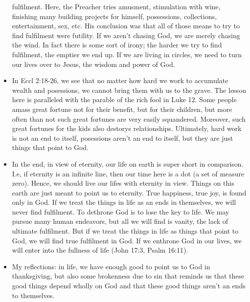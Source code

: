 \begin{itemize}
{  fulfilment.  Here, the Preacher tries amusment, stimulation with wine,
  finishing many building projects for himself, possessions, collections,
  entertainment, sex, etc.  His conclusion was that all of those means to try
  to find fulfilment were futility.  If we aren't chasing God, we are merely
  chasing the wind.  In fact there is some sort of irony; the harder we try
  to find fulfilment, the emptier we end up.  If we are living in circles, we
  need to turn our lives over to Jesus, the wisdom and power of God.}
  \item{In Eccl 2:18-26, we see that no matter how hard we work to accumulate
  wealth and posessions, we cannot bring them with us to the grave.  The
  lesson here is paralleled with the parable of the rich fool in Luke 12.
  Some people amass great fortune not for their benefit, but for their
  children, but more often than not such great fortunes are very easily
  squandered.  Moreover, such great fortunes for the kids also destorys
  relationships.  Ultimately, hard work is not an end to itself, posessions
  aren't an end to itself, but they are just things that point to God. }
  \item{In the end, in view of eternity, our life on earth is super short in
  comparison.  I.e, if eternity is an infinite line, then our time here is a
  dot (a set of measure zero).  Hence, we should live our lifes with eternity
  in view.  Things on this earth are just meant to point us to eternity.
  True happiness, true joy, is found only in God.  If we treat the things in
  life as an ends in themselves, we will never find fulfilment.  To dethrone
  God is to lose the key to life.  We may pursue many human endeavors, but
  all we will find is vanity, the lack of ultimate fulfilment.  But if we
  treat the things in life as things that point to God, we will find true
  fulfilment in God.  If we enthrone God in our lives, we will enter into the
  fullness of life (John 17:3, Psalm 16:11).  }
  \item{My reflections: in life, we have enough good to point us to God in
  thanksgiving, but also some brokenness due to sin that reminds us that
  these good things depend wholly on God and that these good things aren't an
  ends to themselves.}
\end{itemize}